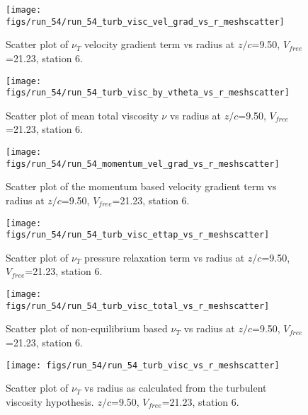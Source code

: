 \begin{figure}[H]
\centering
\texttt{[image: figs/run\_54/run\_54\_turb\_visc\_vel\_grad\_vs\_r\_meshscatter]}
\caption{Scatter plot of $\nu_T$ velocity gradient term vs radius at $z/c$=9.50, $V_{free}$=21.23, station 6.}
\end{figure}


\begin{figure}[H]
\centering
\texttt{[image: figs/run\_54/run\_54\_turb\_visc\_by\_vtheta\_vs\_r\_meshscatter]}
\caption{Scatter plot of mean total viscosity $\nu$ vs radius at $z/c$=9.50, $V_{free}$=21.23, station 6.}
\end{figure}


\begin{figure}[H]
\centering
\texttt{[image: figs/run\_54/run\_54\_momentum\_vel\_grad\_vs\_r\_meshscatter]}
\caption{Scatter plot of the momentum based velocity gradient term vs radius at $z/c$=9.50, $V_{free}$=21.23, station 6.}
\end{figure}


\begin{figure}[H]
\centering
\texttt{[image: figs/run\_54/run\_54\_turb\_visc\_ettap\_vs\_r\_meshscatter]}
\caption{Scatter plot of $\nu_T$ pressure relaxation term vs radius at $z/c$=9.50, $V_{free}$=21.23, station 6.}
\end{figure}


\begin{figure}[H]
\centering
\texttt{[image: figs/run\_54/run\_54\_turb\_visc\_total\_vs\_r\_meshscatter]}
\caption{Scatter plot of non-equilibrium based $\nu_T$ vs radius at $z/c$=9.50, $V_{free}$=21.23, station 6.}
\end{figure}


\begin{figure}[H]
\centering
\texttt{[image: figs/run\_54/run\_54\_turb\_visc\_vs\_r\_meshscatter]}
\caption{Scatter plot of $\nu_T$ vs radius as calculated from the turbulent viscosity hypothesis. $z/c$=9.50, $V_{free}$=21.23, station 6.}
\end{figure}


